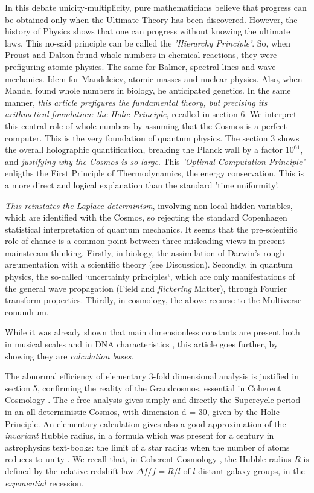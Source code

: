 \documentclass[twoside,draft]{article}
\begin{document}
\begin{sloppypar}
In this debate unicity-multiplicity, pure mathematicians believe that progress can be obtained only when the Ultimate Theory has been discovered. However, the history of Physics shows that one can progress without knowing the ultimate laws. This no-said principle can be called the \textit{'Hierarchy Principle'}. So, when Proust and Dalton found whole numbers in chemical reactions, they were prefiguring atomic physics. The same for Balmer, spectral lines and wave mechanics. Idem for Mandeleiev, atomic masses and nuclear physics. Also, when Mandel found whole numbers in biology, he anticipated genetics. In the same manner, \textit{this article prefigures the fundamental theory, but precising its arithmetical foundation: the Holic Principle}, recalled in section 6. We interpret this central role of whole numbers by assuming that the Cosmos is a perfect computer. This is the very foundation of quantum physics. The section 3 shows the overall holographic quantification, breaking the Planck wall by a factor $10^{61}$, and \textit{justifying why the Cosmos is so large}.
This \textit{'Optimal Computation Principle'} enligths the First Principle of Thermodynamics, the energy conservation. This is a more direct and logical explanation than the standard 'time uniformity'. 

\textit{This reinstates the Laplace determinism}, involving non-local hidden variables, which are identified with the Cosmos, so rejecting the standard Copenhagen statistical interpretation of quantum mechanics. It seems that the pre-scientific role of chance is a common point between three misleading views in present mainstream thinking. Firstly, in biology, the assimilation of Darwin's rough argumentation with a scientific theory (see Discussion). Secondly, in quantum physics, the so-called `uncertainty principles`, which are only manifestations of the general wave propagation (Field and \textit{flickering} Matter), through Fourier transform properties. Thirdly, in cosmology, the above recurse to the Multiverse conundrum.

While it was already shown that main dimensionless constants are present both in musical scales and in DNA characteristics \cite{Sanchez1}, this article goes further, by showing they are \textit{calculation bases}.

The abnormal efficiency of elementary 3-fold dimensional analysis is justified in section 5, confirming the reality of the Grandcosmos, essential in Coherent Cosmology \cite{Sanchez1}. The $c$-free analysis gives simply and directly the Supercycle period in an all-deterministic Cosmos, with dimension d = 30, given by the Holic Principle. An elementary calculation gives also a good approximation of the \textit{invariant} Hubble radius, in a formula which was present for a century in astrophysics text-books: the limit of a star radius when the number of atoms reduces to unity \cite{Sanchez1}. We recall that, in Coherent Cosmology \cite{Sanchez1}, the Hubble radius $R$ is defined by the relative redshift law $\Delta f/f = R/l$ of $l$-distant galaxy groups, in the \textit{exponential} recession.


\end{sloppypar}
\end{document}
